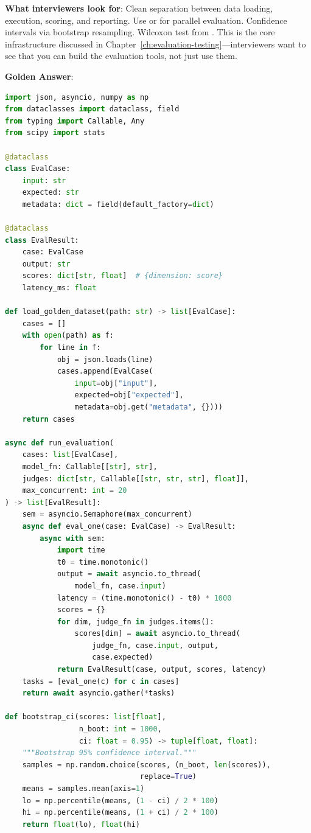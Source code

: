 \textbf{What interviewers look for}: Clean separation between data loading, execution, scoring, and reporting. Use  or  for parallel evaluation. Confidence intervals via bootstrap resampling. Wilcoxon test from . This is the core infrastructure discussed in Chapter~\ref{ch:evaluation-testing}---interviewers want to see that you can build the evaluation tools, not just use them.

\textbf{Golden Answer}:

\begin{lstlisting}[language=Python]
import json, asyncio, numpy as np
from dataclasses import dataclass, field
from typing import Callable, Any
from scipy import stats

@dataclass
class EvalCase:
    input: str
    expected: str
    metadata: dict = field(default_factory=dict)

@dataclass
class EvalResult:
    case: EvalCase
    output: str
    scores: dict[str, float]  # {dimension: score}
    latency_ms: float

def load_golden_dataset(path: str) -> list[EvalCase]:
    cases = []
    with open(path) as f:
        for line in f:
            obj = json.loads(line)
            cases.append(EvalCase(
                input=obj["input"],
                expected=obj["expected"],
                metadata=obj.get("metadata", {})))
    return cases

async def run_evaluation(
    cases: list[EvalCase],
    model_fn: Callable[[str], str],
    judges: dict[str, Callable[[str, str, str], float]],
    max_concurrent: int = 20
) -> list[EvalResult]:
    sem = asyncio.Semaphore(max_concurrent)
    async def eval_one(case: EvalCase) -> EvalResult:
        async with sem:
            import time
            t0 = time.monotonic()
            output = await asyncio.to_thread(
                model_fn, case.input)
            latency = (time.monotonic() - t0) * 1000
            scores = {}
            for dim, judge_fn in judges.items():
                scores[dim] = await asyncio.to_thread(
                    judge_fn, case.input, output,
                    case.expected)
            return EvalResult(case, output, scores, latency)
    tasks = [eval_one(c) for c in cases]
    return await asyncio.gather(*tasks)

def bootstrap_ci(scores: list[float],
                 n_boot: int = 1000,
                 ci: float = 0.95) -> tuple[float, float]:
    """Bootstrap 95% confidence interval."""
    samples = np.random.choice(scores, (n_boot, len(scores)),
                               replace=True)
    means = samples.mean(axis=1)
    lo = np.percentile(means, (1 - ci) / 2 * 100)
    hi = np.percentile(means, (1 + ci) / 2 * 100)
    return float(lo), float(hi)


\end{lstlisting}
